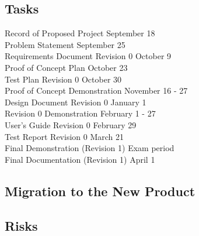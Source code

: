 \documentclass[12pt]{article}
\begin{document}
\subsection{Tasks}\label{SubSec_Tasks} %
Record of Proposed Project \hfill September 18\\
Problem Statement \hfill September 25\\
Requirements Document Revision 0 \hfill October 9\\
Proof of Concept Plan \hfill October 23\\
Test Plan Revision 0 \hfill October 30\\
Proof of Concept Demonstration \hfill November 16 - 27\\
Design Document Revision 0 \hfill January 1\\
Revision 0 Demonstration \hfill February 1 - 27\\
User's Guide Revision 0 \hfill February 29\\
Test Report Revision 0 \hfill March 21\\
Final Demonstration (Revision 1) \hfill Exam period\\
Final Documentation (Revision 1) \hfill April 1
\subsection{Migration to the New Product} %
\subsection{Risks} %
\end{document}
